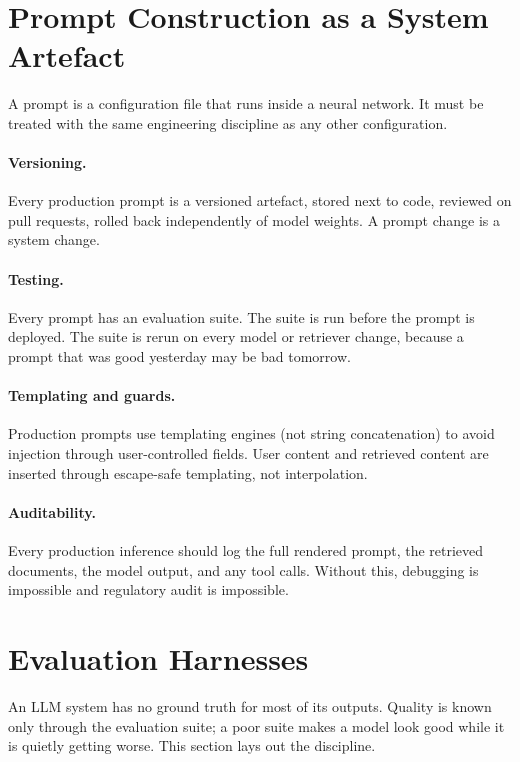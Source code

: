 \section{Prompt Construction as a System Artefact}

A prompt is a configuration file that runs inside a neural
network. It must be treated with the same engineering discipline
as any other configuration.

\paragraph{Versioning.} Every production prompt is a versioned
artefact, stored next to code, reviewed on pull requests, rolled
back independently of model weights. A prompt change is a system
change.

\paragraph{Testing.} Every prompt has an evaluation suite. The
suite is run before the prompt is deployed. The suite is rerun on
every model or retriever change, because a prompt that was good
yesterday may be bad tomorrow.

\paragraph{Templating and guards.} Production prompts use
templating engines (not string concatenation) to avoid injection
through user-controlled fields. User content and retrieved content
are inserted through escape-safe templating, not interpolation.

\paragraph{Auditability.} Every production inference should log
the full rendered prompt, the retrieved documents, the model
output, and any tool calls. Without this, debugging is impossible
and regulatory audit is impossible.

\section{Evaluation Harnesses}

An LLM system has no ground truth for most of its outputs. Quality
is known only through the evaluation suite; a poor suite makes a
model look good while it is quietly getting worse. This section
lays out the discipline.

